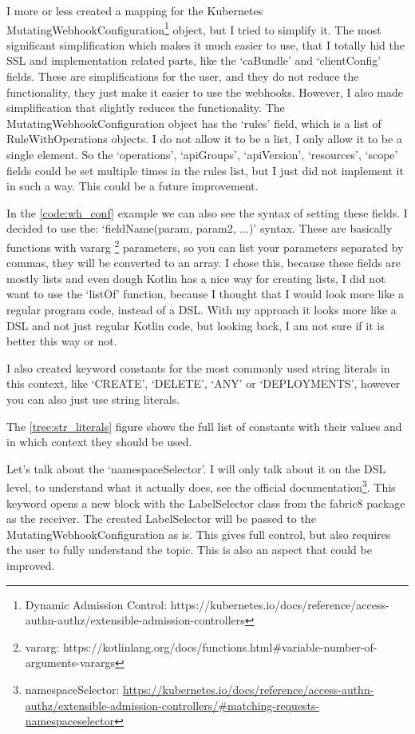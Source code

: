 I more or less created a mapping for the Kubernetes MutatingWebhookConfiguration\footnote{Dynamic Admission Control: https://kubernetes.io/docs/reference/access-authn-authz/extensible-admission-controllers} object, but I tried to simplify it. The most significant simplification which makes it much easier to use, that I totally hid the SSL and implementation related parts, like the `caBundle' and `clientConfig' fields. These are simplifications for the user, and they do not reduce the functionality, they just make it easier to use the webhooks. However, I also made simplification that slightly reduces the functionality. The MutatingWebhookConfiguration object has the `rules' field, which is a list of RuleWithOperations objects. I do not allow it to be a list, I only allow it to be a single element. So the `operations', `apiGroups', `apiVersion', `resources', `scope' fields could be set multiple times in the rules list, but I just did not implement it in such a way. This could be a future improvement.

In the \ref{code:wh_conf} example we can also see the syntax of setting these fields. I decided to use the: `fieldName(param, param2, ...)' syntax. These are basically functions with vararg \footnote{vararg: https://kotlinlang.org/docs/functions.html\#variable-number-of-arguments-varargs} parameters, so you can list your parameters separated by commas, they will be converted to an array. I chose this, because these fields are mostly lists and even dough Kotlin has a nice way for creating lists, I did not want to use the `listOf' function, because I thought that I would look more like a regular program code, instead of a DSL. With my approach it looks more like a DSL and not just regular Kotlin code, but looking back, I am not sure if it is better this way or not.

I also created keyword constants for the most commonly used string literals in this context, like `CREATE', `DELETE', `ANY' or `DEPLOYMENTS', however you can also just use string literals.

The \ref{tree:str_literals} figure shows the full list of constants with their values and in which context they should be used.



Let's talk about the `namespaceSelector'. I will only talk about it on the DSL level, to understand what it actually does, see the official documentation\footnote{namespaceSelector: \url{https://kubernetes.io/docs/reference/access-authn-authz/extensible-admission-controllers/\#matching-requests-namespaceselector}}. 
This keyword opens a new block with the LabelSelector class from the fabric8 package as the receiver. The created LabelSelector will be passed to the MutatingWebhookConfiguration as is. This gives full control, but also requires the user to fully understand the topic. This is also an aspect that could be improved.

